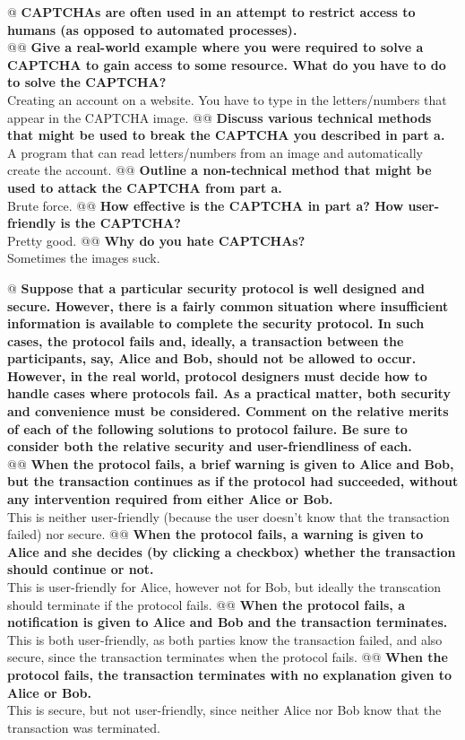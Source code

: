 \documentclass{article}
\begin{document}
\begin{easylist}
 	@ \textbf{CAPTCHAs are often used in an attempt to restrict access to humans (as opposed to automated processes).}\\
 	@@ \textbf{Give a real-world example where you were required to solve a CAPTCHA to gain access to some resource. What do you have to do to solve the CAPTCHA?}\\
 		Creating an account on a website. You have to type in the letters/numbers that appear in the CAPTCHA image.
 	@@ \textbf{Discuss various technical methods that might be used to break the CAPTCHA you described in part a.}\\
 		A program that can read letters/numbers from an image and automatically create the account.
 	@@ \textbf{Outline a non-technical method that might be used to attack the CAPTCHA from part a.}\\
 		Brute force.
 	@@ \textbf{How effective is the CAPTCHA in part a? How user-friendly is the CAPTCHA?}\\
 		Pretty good.
 	@@ \textbf{Why do you hate CAPTCHAs?}\\
 		Sometimes the images suck.
 	
 	@ \textbf{Suppose that a particular security protocol is well designed and secure. However, there is a fairly common situation where insufficient information is available to complete the security protocol. In such cases, the protocol fails and, ideally, a transaction between the participants, say, Alice and Bob, should not be allowed to occur. However, in the real world, protocol designers must decide how to handle cases where protocols fail. As a practical matter, both security and convenience must be considered. Comment on the relative merits of each of the following solutions to protocol failure. Be sure to consider both the relative security and user-friendliness of each.}\\
 	@@ \textbf{When the protocol fails, a brief warning is given to Alice and Bob, but the transaction continues as if the protocol had succeeded, without any intervention required from either Alice or Bob.}\\
 		This is neither user-friendly (because the user doesn't know that the transaction failed) nor secure.
 	@@ \textbf{When the protocol fails, a warning is given to Alice and she decides (by clicking a checkbox) whether the transaction should continue or not.}\\
 		This is user-friendly for Alice, however not for Bob, but ideally the transcation should terminate if the protocol fails.
 	@@ \textbf{When the protocol fails, a notification is given to Alice and Bob and the transaction terminates.}\\
 		This is both user-friendly, as both parties know the transaction failed, and also secure, since the transaction terminates when the protocol fails.
 	@@ \textbf{When the protocol fails, the transaction terminates with no explanation given to Alice or Bob.}\\
 		This is secure, but not user-friendly, since neither Alice nor Bob know that the transaction was terminated.
 	

\end{easylist}
\end{document}
